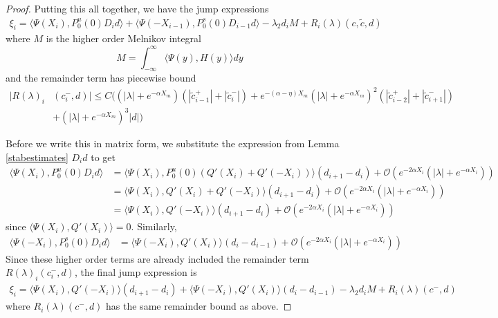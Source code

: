 \documentclass[thesis.tex]{subfiles}
\begin{document}
\begin{lemma}
\begin{proof}
Putting this all together, we have the jump expressions
\begin{align*}
\xi_i = \langle \Psi(X_i), P_0^u(0) D_i d \rangle
+ \langle \Psi(-X_{i-1}), P_0^s(0) D_{i-1} d \rangle 
- \lambda_2 d_i M + R_i(\lambda)(c, \tilde{c}, d)
\end{align*}
where $M$ is the higher order Melnikov integral
\[
M = \int_{-\infty}^\infty \langle \Psi(y), H(y) \rangle dy 
\]
and the remainder term has piecewise bound
\begin{align*}
|R(\lambda)_i&(c_i^-, d)| \leq C \Big( (|\lambda| + e^{-\alpha X_m})(|\tilde{c}_{i-1}^+| + |\tilde{c}_{i}^-|) + e^{-(\alpha - \eta) X_m}(|\lambda| + e^{-\alpha X_m})^2(|\tilde{c}_{i-2}^+| + |\tilde{c}_{i+1}^-|) \\
&+ (|\lambda| + e^{-\alpha X_m})^3 |d| \Big)
\end{align*}

Before we write this in matrix form, we substitute the expression from Lemma \ref{stabestimates} $D_i d$ to get
\begin{align*}
\langle \Psi(X_i), P_0^u(0) D_i d \rangle
&= \langle \Psi(X_i), P_0^u(0) (Q'(X_i) + Q'(-X_i)) \rangle (d_{i+1} - d_i)
+\mathcal{O}(e^{-2 \alpha X_i}(|\lambda| + e^{-\alpha X_i})) \\
&= \langle \Psi(X_i), Q'(X_i) + Q'(-X_i) \rangle (d_{i+1} - d_i)
+\mathcal{O}(e^{-2 \alpha X_i}(|\lambda| + e^{-\alpha X_i})) \\
&= \langle \Psi(X_i), Q'(-X_i) \rangle (d_{i+1} - d_i)
+\mathcal{O}(e^{-2 \alpha X_i}(|\lambda| + e^{-\alpha X_i})) 
\end{align*}
since $\langle \Psi(X_i), Q'(X_i) \rangle = 0$. Similarly, 
\begin{align*}
\langle \Psi(-X_i), P_0^s(0) D_i d \rangle
&= \langle \Psi(-X_i), Q'(X_i) \rangle (d_i - d_{i-1})
+\mathcal{O}(e^{-2 \alpha X_i}(|\lambda| + e^{-\alpha X_i})) 
\end{align*}
Since these higher order terms are already included the remainder term $R(\lambda)_i(c_i^-, d)$, the final jump expression is
\begin{align*}
\xi_i = \langle \Psi(X_i), Q'(-X_i) \rangle (d_{i+1} - d_i)
+ \langle \Psi(-X_i), Q'(X_i) \rangle (d_i - d_{i-1})
- \lambda_2 d_i M + R_i(\lambda)(c^-, d)
\end{align*}
where $R_i(\lambda)(c^-, d)$ has the same remainder bound as above.


\end{proof}
\end{lemma}
\end{document}
